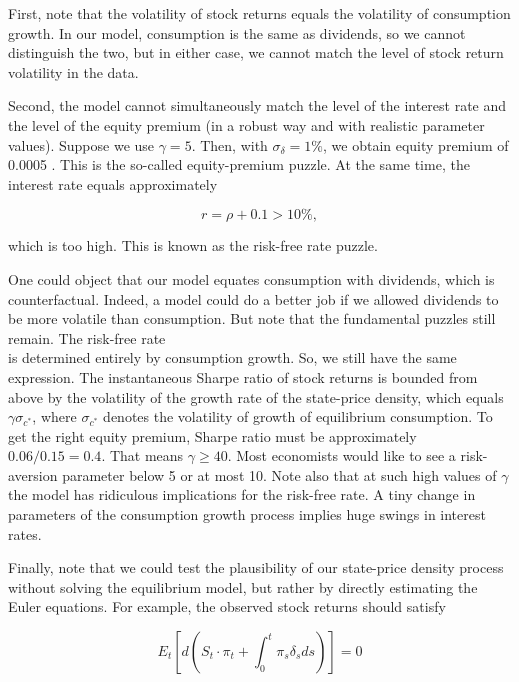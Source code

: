 \documentclass[\topdir/lecture\_notes.tex]{subfiles}
\begin{document}
First, note that the volatility of stock returns equals the volatility of consumption growth. In our model, consumption is the same as dividends, so we cannot distinguish the two, but in either case, we cannot match the level of stock return volatility in the data.

Second, the model cannot simultaneously match the level of the interest rate and the level of the equity premium (in a robust way and with realistic parameter values). Suppose we use \(\gamma=5\). Then, with \(\sigma_{\delta}=1 \%\), we obtain equity premium of 0.0005 . This is the so-called equity-premium puzzle. At the same time, the interest rate equals approximately

\begin{equation}
r=\rho+0.1>10 \%,
\end{equation}

which is too high. This is known as the risk-free rate puzzle.

One could object that our model equates consumption with dividends, which is counterfactual. Indeed, a model could do a better job if we allowed dividends to be more volatile than consumption. But note that the fundamental puzzles still remain. The risk-free rate\\
is determined entirely by consumption growth. So, we still have the same expression. The instantaneous Sharpe ratio of stock returns is bounded from above by the volatility of the growth rate of the state-price density, which equals \(\gamma \sigma_{c^{*}}\), where \(\sigma_{c^{*}}\) denotes the volatility of growth of equilibrium consumption. To get the right equity premium, Sharpe ratio must be approximately \(0.06 / 0.15=0.4\). That means \(\gamma \geq 40\). Most economists would like to see a risk-aversion parameter below 5 or at most 10. Note also that at such high values of \(\gamma\) the model has ridiculous implications for the risk-free rate. A tiny change in parameters of the consumption growth process implies huge swings in interest rates.

Finally, note that we could test the plausibility of our state-price density process without solving the equilibrium model, but rather by directly estimating the Euler equations. For example, the observed stock returns should satisfy

\begin{equation}
E_{t}\left[d\left(S_{t} \cdot \pi_{t}+\int_{0}^{t} \pi_{s} \delta_{s} d s\right)\right]=0
\end{equation}
\end{document}
